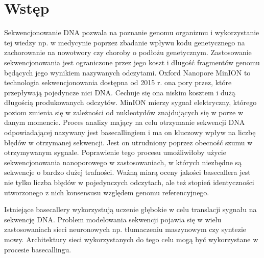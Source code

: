 \documentclass[a4paper,11pt,twoside]{report}
\theoremstyle{definition}
\begin{document}
\thispagestyle{empty}
\newpage

\null\thispagestyle{empty}\newpage


\tableofcontents
\thispagestyle{empty}

\newpage %
\null\newpage
\null\thispagestyle{empty}\newpage
\pagestyle{fancy}
\setcounter{page}{12} %

\chapter{Wstęp}
Sekwencjonowanie DNA pozwala na poznanie genomu organizmu i wykorzystanie tej wiedzy np. w medycynie poprzez zbadanie wpływu kodu genetycznego na zachorowanie na nowotwory \cite{cancerNonCoding} czy choroby o podłożu genetycznym\cite{diagnosis}. Zastosowanie sekwencjonowania jest ograniczone przez jego koszt i długość fragmentów genomu będących jego wynikiem nazywanych odczytami. Oxford Nanopore MinION to technologia sekwencjonowania dostępna od 2015 r. ona pory przez, które przepływają pojedyncze nici DNA. Cechuje się ona niskim kosztem i dużą długością produkowanych odczytów. MinION mierzy sygnał elektryczny, którego poziom zmienia się w zależności od nukleotydów znajdujących się w porze  w danym momencie. Proces analizy mający na celu otrzymanie sekwencji DNA odpowiadającej nazywany jest basecallingiem i ma on kluczowy wpływ na liczbę błędów  w otrzymanej sekwencji. Jest on utrudniony poprzez obecność szumu w otrzymywanym sygnale. Poprawienie tego procesu umożliwiłoby użycie sekwencjonowania nanoporowego w zastosowaniach, w których niezbędne są sekwencje o bardzo dużej trafności\cite{snp}. Ważną miarą oceny jakości basecallera jest nie tylko liczba błędów w pojedynczych odczytach, ale też stopień identyczności utworzonego z nich konsensusu względem genomu referencyjnego.

Istniejące basecallery wykorzystują uczenie głębokie w celu translacji sygnału na sekwencję DNA. Problem modelowania sekwencji pojawia się w wielu zastosowaniach sieci neuronowych np. tłumaczeniu maszynowym czy syntezie mowy. Architektury sieci wykorzystanych do tego celu mogą być wykorzystane w procesie basecallingu.
\end{document}
